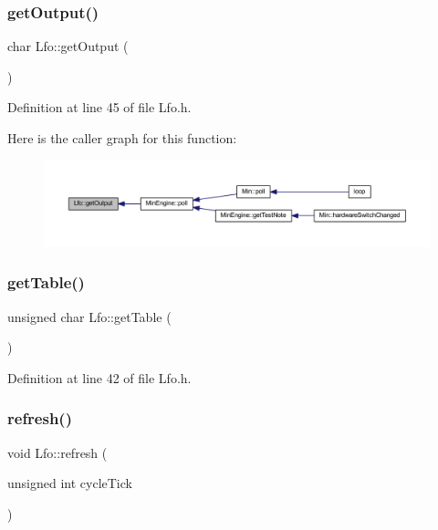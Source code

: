 \mbox{\label{class_lfo_a0363f6a07cb699caf291b4954a40f152}} 
\subsubsection{\texorpdfstring{get\+Output()}{getOutput()}}
{\footnotesize\ttfamily char Lfo\+::get\+Output (\begin{DoxyParamCaption}{ }\end{DoxyParamCaption})\hspace{0.3cm}{\ttfamily [inline]}}



Definition at line 45 of file Lfo.\+h.

Here is the caller graph for this function\+:
\nopagebreak
\begin{figure}[H]
\begin{center}
\leavevmode
\includegraphics[width=350pt]{class_lfo_a0363f6a07cb699caf291b4954a40f152_icgraph}
\end{center}
\end{figure}
\mbox{\label{class_lfo_a9f017ebd3b628e4afbca7371cdebc61c}} 
\subsubsection{\texorpdfstring{get\+Table()}{getTable()}}
{\footnotesize\ttfamily unsigned char Lfo\+::get\+Table (\begin{DoxyParamCaption}{ }\end{DoxyParamCaption})\hspace{0.3cm}{\ttfamily [inline]}}



Definition at line 42 of file Lfo.\+h.

\mbox{\label{class_lfo_a42c8d118df4ecbf3057319b56203133d}} 
\subsubsection{\texorpdfstring{refresh()}{refresh()}}
{\footnotesize\ttfamily void Lfo\+::refresh (\begin{DoxyParamCaption}\item[{unsigned int}]{cycle\+Tick }\end{DoxyParamCaption})}



